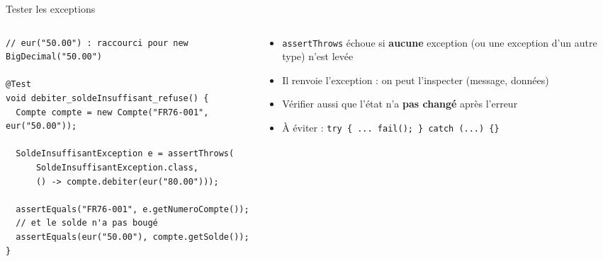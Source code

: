 \documentclass[aspectratio=169,10pt]{beamer}
\begin{document}

\begin{frame}[fragile]{Tester les exceptions}
  \begin{columns}[T]
    \begin{column}{0.6\textwidth}
\begin{lstlisting}[basicstyle=\lstcode\scriptsize]
// eur("50.00") : raccourci pour new BigDecimal("50.00")

@Test
void debiter_soldeInsuffisant_refuse() {
  Compte compte = new Compte("FR76-001", eur("50.00"));

  SoldeInsuffisantException e = assertThrows(
      SoldeInsuffisantException.class,
      () -> compte.debiter(eur("80.00")));

  assertEquals("FR76-001", e.getNumeroCompte());
  // et le solde n'a pas bougé
  assertEquals(eur("50.00"), compte.getSolde());
}
\end{lstlisting}
    \end{column}
    \begin{column}{0.37\textwidth}
      \begin{itemize}
        \item \texttt{assertThrows} échoue si \textbf{aucune} exception (ou une exception d'un autre type) n'est levée
        \item Il renvoie l'exception : on peut l'inspecter (message, données)
        \item Vérifier aussi que l'état n'a \textbf{pas changé} après l'erreur
        \item \alert{À éviter} : \texttt{try \{ ... fail(); \} catch (...) \{\}}
      \end{itemize}
    \end{column}
  \end{columns}
\end{frame}
\end{document}

